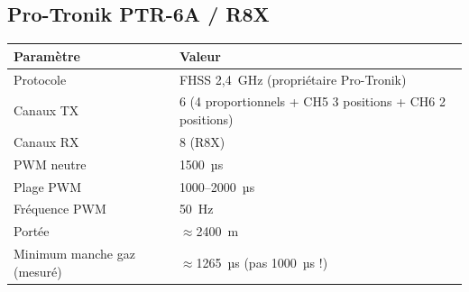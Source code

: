 \documentclass[12pt,a4paper]{article}
\begin{document}
\subsection{Pro-Tronik PTR-6A / R8X}

\begin{longtable}{L{5cm} L{7cm}}
  \toprule
  \textcolor{tableheadfg}{\textbf{Paramètre}} &
  \textcolor{tableheadfg}{\textbf{Valeur}} \\
  \midrule
  \endhead
  \bottomrule
  \endfoot
  Protocole & FHSS 2,4~GHz (propriétaire Pro-Tronik) \\[3pt]
  Canaux TX & 6 (4 proportionnels + CH5 3 positions + CH6 2 positions) \\[3pt]
  Canaux RX & 8 (R8X) \\[3pt]
  PWM neutre & 1500~µs \\[3pt]
  Plage PWM & 1000--2000~µs \\[3pt]
  Fréquence PWM & 50~Hz \\[3pt]
  Portée & $\approx$2400~m \\[3pt]
  Minimum manche gaz (mesuré) & $\approx$1265~µs (pas 1000~µs !) \\
\end{longtable}
\end{document}
